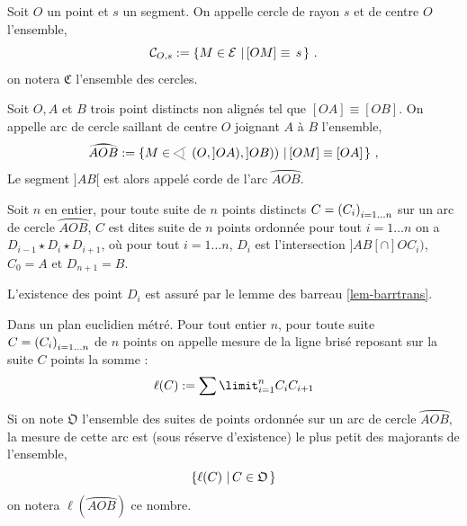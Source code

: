 \begin{defi}[Cercle]
    Soit $O$ un point et $s$ un segment. On appelle cercle de rayon $s$ et de centre $O$ l'ensemble,
    \begin{equation*}
        \mathcal{C}_{O,s}:=\left\{M\in \mathcal{E}\,\left|\, [OM]\equiv \, s\right.\right\}\,.
    \end{equation*}
    on notera $\mathfrak{C}$ l'ensemble des cercles. 
\end{defi}
\begin{defi}
Soit $O,A$ et $B$ trois point distincts non alignés tel que $[OA]\equiv [OB]$. On appelle arc de cercle saillant de centre $O$ joignant $A$ à $B$ l'ensemble,
\begin{equation*}
    \wideparen{AOB} :=\ensemble{M\in \anglesaillant\left(O,]OA),]OB)\right)}{[OM]\equiv [OA]}\,,
\end{equation*}
Le segment $]AB[$ est alors appelé corde de l'arc $\wideparen{AOB}$.
\end{defi}
\begin{defi}
Soit $n$ en entier, pour toute suite de $n$ points distincts $C = \left(C_{i}\right)_{i = 1\ldots n}$ sur un arc de cercle $\wideparen{AOB}$, $C$ est dites suite de $n$ points ordonnée \ssi pour tout $i= 1\ldots n $ on a $D_{i-1} \star D_i \star D_{i+1}$, où pour tout $i= 1 \ldots n$,  $D_i$ est l'intersection $]AB[\cap ]O C_i)$, $C_0=A$ et $D_{n+1}=B$.
\end{defi}
\begin{rema}
    L'existence des point $D_i$ est assuré par le lemme des barreau \ref{lem-barrtrans}.
\end{rema}
\begin{defi}
Dans un plan euclidien métré. Pour tout entier $n$, pour toute suite $C = \left(C_{i}\right)_{i = 1\ldots n}$ de $n$ points on appelle mesure de la ligne brisé reposant sur la suite $C$ points la somme :
\begin{equation*}
    \ell(C) : = \sum\limit_{i=1}^n C_i C_{i+1}
\end{equation*}
\end{defi}
\begin{defi}
Si on note $\mathfrak{O}$ l'ensemble des suites de points ordonnée sur un arc de cercle $\wideparen{AOB}$, la mesure de cette arc est (sous réserve d'existence) le plus petit des majorants de l'ensemble,
\begin{equation*}
    \left\{\ell (C)\,\left|\,C\in \mathfrak{O}\right.\right\}
\end{equation*}
on notera $\ell\left(\wideparen{AOB}\right)$ ce nombre. 
\end{defi}
